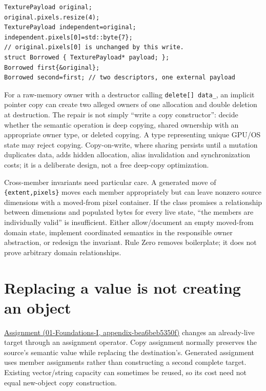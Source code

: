 \begin{verbatim}
TexturePayload original;
original.pixels.resize(4);
TexturePayload independent=original;
independent.pixels[0]=std::byte{7};
// original.pixels[0] is unchanged by this write.
struct Borrowed { TexturePayload* payload; };
Borrowed first{&original};
Borrowed second=first; // two descriptors, one external payload
\end{verbatim}

For a raw-memory owner with a destructor calling \texttt{delete{[}{]}\ data\_}, an implicit pointer copy can create two alleged owners of one allocation and double deletion at destruction. The repair is not simply ``write a copy constructor'': decide whether the semantic operation is deep copying, shared ownership with an appropriate owner type, or deleted copying. A type representing unique GPU/OS state may reject copying. Copy-on-write, where sharing persists until a mutation duplicates data, adds hidden allocation, alias invalidation and synchronization costs; it is a deliberate design, not a free deep-copy optimization.

Cross-member invariants need particular care. A generated move of \texttt{\{extent,pixels\}} moves each member appropriately but can leave nonzero source dimensions with a moved-from pixel container. If the class promises a relationship between dimensions and populated bytes for every live state, ``the members are individually valid'' is insufficient. Either allow/document an empty moved-from domain state, implement coordinated semantics in the responsible owner abstraction, or redesign the invariant. Rule Zero removes boilerplate; it does not prove arbitrary domain relationships.

\section{Replacing a value is not creating an object}\label{05-engine-i-ch003-replacing-a-value-is-not-creating-an-object}

\href{../01-Foundations-I/main.pdf\#nameddest=appendix-bea6beb5350f}{Assignment (01-Foundations-I, appendix-bea6beb5350f)} changes an already-live target through an assignment operator. Copy assignment normally preserves the source's semantic value while replacing the destination's. Generated assignment uses member assignments rather than constructing a second complete target. Existing vector/string capacity can sometimes be reused, so its cost need not equal new-object copy construction.

